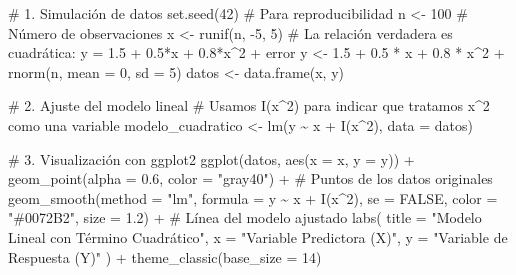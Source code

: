 \documentclass[
  letterpaper,
  DIV=11,
  numbers=noendperiod]{scrreprt}
\newenvironment{Shaded}{\begin{snugshade}}{\end{snugshade}}
\newcommand{\AttributeTok}[1]{\textcolor[rgb]{0.40,0.45,0.13}{#1}}
\newcommand{\CommentTok}[1]{\textcolor[rgb]{0.37,0.37,0.37}{#1}}
\newcommand{\ConstantTok}[1]{\textcolor[rgb]{0.56,0.35,0.01}{#1}}
\newcommand{\DecValTok}[1]{\textcolor[rgb]{0.68,0.00,0.00}{#1}}
\newcommand{\FloatTok}[1]{\textcolor[rgb]{0.68,0.00,0.00}{#1}}
\newcommand{\FunctionTok}[1]{\textcolor[rgb]{0.28,0.35,0.67}{#1}}
\newcommand{\NormalTok}[1]{\textcolor[rgb]{0.00,0.23,0.31}{#1}}
\newcommand{\OtherTok}[1]{\textcolor[rgb]{0.00,0.23,0.31}{#1}}
\newcommand{\SpecialCharTok}[1]{\textcolor[rgb]{0.37,0.37,0.37}{#1}}
\newcommand{\StringTok}[1]{\textcolor[rgb]{0.13,0.47,0.30}{#1}}
\begin{document}
\begin{tcolorbox}
\begin{Shaded}
\begin{Highlighting}[]
\CommentTok{\# 1. Simulación de datos}
\FunctionTok{set.seed}\NormalTok{(}\DecValTok{42}\NormalTok{) }\CommentTok{\# Para reproducibilidad}
\NormalTok{n }\OtherTok{\textless{}{-}} \DecValTok{100} \CommentTok{\# Número de observaciones}
\NormalTok{x }\OtherTok{\textless{}{-}} \FunctionTok{runif}\NormalTok{(n, }\SpecialCharTok{{-}}\DecValTok{5}\NormalTok{, }\DecValTok{5}\NormalTok{)}
\CommentTok{\# La relación verdadera es cuadrática: y = 1.5 + 0.5*x + 0.8*x\^{}2 + error}
\NormalTok{y }\OtherTok{\textless{}{-}} \FloatTok{1.5} \SpecialCharTok{+} \FloatTok{0.5} \SpecialCharTok{*}\NormalTok{ x }\SpecialCharTok{+} \FloatTok{0.8} \SpecialCharTok{*}\NormalTok{ x}\SpecialCharTok{\^{}}\DecValTok{2} \SpecialCharTok{+} \FunctionTok{rnorm}\NormalTok{(n, }\AttributeTok{mean =} \DecValTok{0}\NormalTok{, }\AttributeTok{sd =} \DecValTok{5}\NormalTok{)}
\NormalTok{datos }\OtherTok{\textless{}{-}} \FunctionTok{data.frame}\NormalTok{(x, y)}

\CommentTok{\# 2. Ajuste del modelo lineal}
\CommentTok{\# Usamos I(x\^{}2) para indicar que tratamos x\^{}2 como una variable}
\NormalTok{modelo\_cuadratico }\OtherTok{\textless{}{-}} \FunctionTok{lm}\NormalTok{(y }\SpecialCharTok{\textasciitilde{}}\NormalTok{ x }\SpecialCharTok{+} \FunctionTok{I}\NormalTok{(x}\SpecialCharTok{\^{}}\DecValTok{2}\NormalTok{), }\AttributeTok{data =}\NormalTok{ datos)}

\CommentTok{\# 3. Visualización con ggplot2}
\FunctionTok{ggplot}\NormalTok{(datos, }\FunctionTok{aes}\NormalTok{(}\AttributeTok{x =}\NormalTok{ x, }\AttributeTok{y =}\NormalTok{ y)) }\SpecialCharTok{+}
  \FunctionTok{geom\_point}\NormalTok{(}\AttributeTok{alpha =} \FloatTok{0.6}\NormalTok{, }\AttributeTok{color =} \StringTok{"gray40"}\NormalTok{) }\SpecialCharTok{+} \CommentTok{\# Puntos de los datos originales}
  \FunctionTok{geom\_smooth}\NormalTok{(}\AttributeTok{method =} \StringTok{"lm"}\NormalTok{, }\AttributeTok{formula =}\NormalTok{ y }\SpecialCharTok{\textasciitilde{}}\NormalTok{ x }\SpecialCharTok{+} \FunctionTok{I}\NormalTok{(x}\SpecialCharTok{\^{}}\DecValTok{2}\NormalTok{), }\AttributeTok{se =} \ConstantTok{FALSE}\NormalTok{, }\AttributeTok{color =} \StringTok{"\#0072B2"}\NormalTok{, }\AttributeTok{size =} \FloatTok{1.2}\NormalTok{) }\SpecialCharTok{+} \CommentTok{\# Línea del modelo ajustado}
  \FunctionTok{labs}\NormalTok{(}
    \AttributeTok{title =} \StringTok{"Modelo Lineal con Término Cuadrático"}\NormalTok{,}
    \AttributeTok{x =} \StringTok{"Variable Predictora (X)"}\NormalTok{,}
    \AttributeTok{y =} \StringTok{"Variable de Respuesta (Y)"}
\NormalTok{  ) }\SpecialCharTok{+}
  \FunctionTok{theme\_classic}\NormalTok{(}\AttributeTok{base\_size =} \DecValTok{14}\NormalTok{)}
\end{Highlighting}
\end{Shaded}


\end{tcolorbox}
\end{document}
